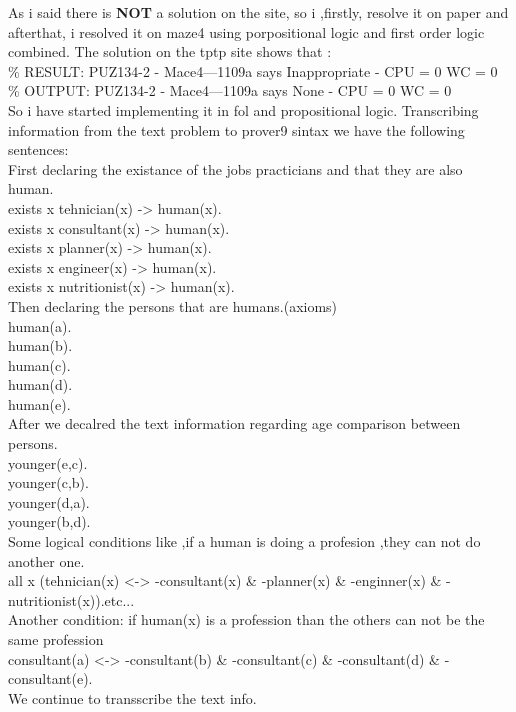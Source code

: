 \begin{itemize}
	\tab As i said there is \textbf{ NOT} a solution on the site, so i ,firstly, resolve it on paper and afterthat, i  resolved it on maze4 using porpositional logic and first order logic combined. The solution on the tptp site shows that :\\
	\tab 	\% RESULT: PUZ134-2 - Mace4---1109a says Inappropriate - CPU = 0 WC = 0 \\
		\% OUTPUT: PUZ134-2 - Mace4---1109a says None - CPU = 0 WC = 0 \\
	\tab So i have started implementing it in fol and propositional logic. Transcribing information from the text problem to prover9 sintax we have the following sentences:\\
	\tab First declaring the existance of the jobs practicians and that they are also human.\\
		exists x tehnician(x) -> human(x).    \\  
		exists x consultant(x) -> human(x).  \\   
		exists x planner(x) -> human(x).\\
		exists x engineer(x) -> human(x).\\
		exists x nutritionist(x) -> human(x).\\
	\tab Then declaring the persons that are humans.(axioms)\\
		human(a).   \\           
		human(b). 	\\	
		human(c).\\
		human(d).\\
		human(e).\\
	\tab After we decalred the text information regarding age comparison between persons.\\
		younger(e,c).  	\\	
		younger(c,b). \\		
		younger(d,a).\\
		younger(b,d).\\
	\tab Some logical conditions like ,if a human is doing a profesion ,they can not do another one.\\
		all x (tehnician(x) <-> -consultant(x) \& -planner(x) \& -enginner(x) \& -nutritionist(x)).etc...\\
	\tab Another condition: if human(x) is a profession than the others can not be the same profession\\
		consultant(a) <-> -consultant(b) \& -consultant(c) \& -consultant(d) \& -consultant(e).\\
	\tab We continue to transscribe the text info.\\

\end{itemize}
